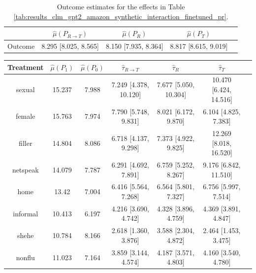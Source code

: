 \documentclass{article}
\begin{document}
\begin{table}[!ht]
\centering
\begin{tabular}{c|cccc}
\toprule
    & $\hat{\mu}(P_{R \rightarrow T})$   & $\hat{\mu}(P_R)$     & $\hat{\mu}(P_T)$     \\
\midrule
    Outcome & 8.295 [8.025, 8.565]               & 8.150 [7.935, 8.364] & 8.817 [8.615, 9.019] \\
\bottomrule
\end{tabular}
\caption{Outcome estimates for the effects in Table \ref{tab:results_clm_gpt2_amazon_synthetic_interaction_finetuned_pr}.}
\label{tab:results_clm_gpt2_amazon_synthetic_interaction_finetuned_pr_outcome}
\end{table}

\begin{table}[!ht]
\centering
\begin{tabular}{c|cccccc}
\toprule
    Treatment   &   $\hat{\mu}(P_1)$ &   $\hat{\mu}(P_0)$ & $\hat{\tau}_{R \rightarrow T}$   & $\hat{\tau}_R$        & $\hat{\tau}_T$         \\
\midrule
    sexual      &             15.237 &              7.988 & 7.249 [4.378, 10.120]            & 7.677 [5.050, 10.304] & 10.470 [6.424, 14.516] \\
    female      &             15.763 &              7.974 & 7.790 [5.748, 9.831]             & 8.021 [6.172, 9.870]  & 6.104 [4.825, 7.383]   \\
    filler      &             14.804 &              8.086 & 6.718 [4.137, 9.298]             & 7.373 [4.922, 9.825]  & 12.269 [8.018, 16.520] \\
    netspeak    &             14.079 &              7.787 & 6.291 [4.692, 7.891]             & 6.759 [5.252, 8.267]  & 9.176 [6.842, 11.510]  \\
    home        &             13.42  &              7.004 & 6.416 [5.564, 7.268]             & 6.564 [5.801, 7.327]  & 6.756 [5.997, 7.514]   \\
    informal    &             10.413 &              6.197 & 4.216 [3.690, 4.742]             & 4.328 [3.896, 4.759]  & 4.369 [3.891, 4.847]   \\
    shehe       &             10.784 &              8.166 & 2.618 [1.360, 3.876]             & 3.588 [2.304, 4.872]  & 2.464 [1.453, 3.475]   \\
    nonflu      &             11.023 &              7.164 & 3.859 [3.144, 4.574]             & 4.187 [3.571, 4.803]  & 4.160 [3.540, 4.780]   \\

\end{tabular}
\end{table}
\end{document}

